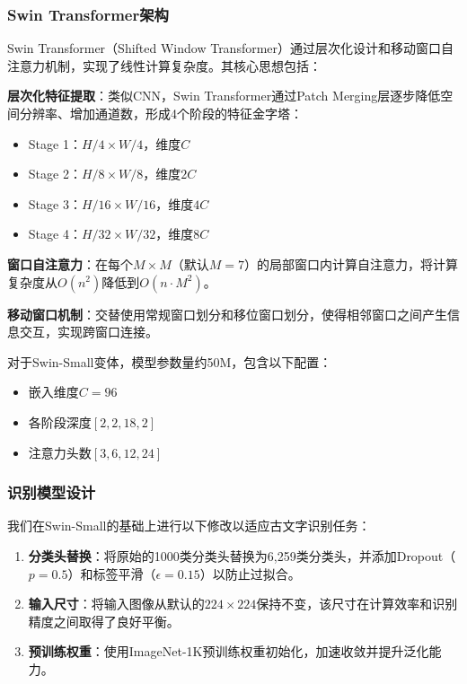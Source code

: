 \documentclass[12pt,a4paper]{article}
\begin{document}
\subsubsection{Swin Transformer架构}

Swin Transformer（Shifted Window Transformer）通过层次化设计和移动窗口自注意力机制，实现了线性计算复杂度。其核心思想包括：

\textbf{层次化特征提取}：类似CNN，Swin Transformer通过Patch Merging层逐步降低空间分辨率、增加通道数，形成4个阶段的特征金字塔：
\begin{itemize}
    \item Stage 1：$H/4 \times W/4$，维度$C$
    \item Stage 2：$H/8 \times W/8$，维度$2C$
    \item Stage 3：$H/16 \times W/16$，维度$4C$
    \item Stage 4：$H/32 \times W/32$，维度$8C$
\end{itemize}

\textbf{窗口自注意力}：在每个$M \times M$（默认$M=7$）的局部窗口内计算自注意力，将计算复杂度从$O(n^2)$降低到$O(n \cdot M^2)$。

\textbf{移动窗口机制}：交替使用常规窗口划分和移位窗口划分，使得相邻窗口之间产生信息交互，实现跨窗口连接。

对于Swin-Small变体，模型参数量约50M，包含以下配置：
\begin{itemize}
    \item 嵌入维度$C = 96$
    \item 各阶段深度$[2, 2, 18, 2]$
    \item 注意力头数$[3, 6, 12, 24]$
\end{itemize}

\subsubsection{识别模型设计}

我们在Swin-Small的基础上进行以下修改以适应古文字识别任务：

\begin{enumerate}
    \item \textbf{分类头替换}：将原始的1000类分类头替换为6,259类分类头，并添加Dropout（$p=0.5$）和标签平滑（$\epsilon=0.15$）以防止过拟合。
    \item \textbf{输入尺寸}：将输入图像从默认的$224 \times 224$保持不变，该尺寸在计算效率和识别精度之间取得了良好平衡。
    \item \textbf{预训练权重}：使用ImageNet-1K预训练权重初始化，加速收敛并提升泛化能力。
\end{enumerate}
\end{document}
